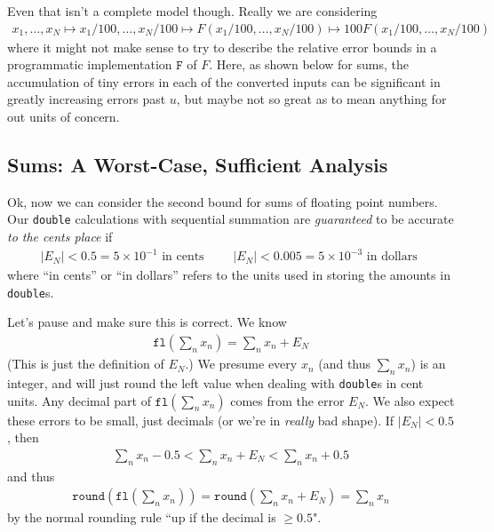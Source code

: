 \documentclass[11pt, oneside]{amsart}   	%
\begin{document}
Even that isn't a complete model though. Really we are considering 
\begin{align*}
    x_1,\dotsc,x_N \mapsto x_1/100,\dotsc,x_N/100 
        \mapsto F(x_1/100,\dotsc,x_N/100) \mapsto 100 F(x_1/100,\dotsc,x_N/100)
\end{align*}
where it might not make sense to try to describe the relative error bounds in a programmatic implementation $\texttt{F}$ of $F$. Here, as shown below for sums, the accumulation of tiny errors in each of the converted inputs can be significant in greatly increasing errors past $u$, but maybe not so great as to mean anything for out units of concern. 

\subsection{Sums: A Worst-Case, Sufficient Analysis}

Ok, now we can consider the second bound for sums of floating point numbers. Our \texttt{double} calculations with sequential summation are {\em guaranteed} to be accurate {\em to the cents place} if
\begin{align*}
    | E_N | < 0.5 = 5\times 10^{-1} \text{ in cents }
    \quad\quad
    | E_N | < 0.005 = 5\times 10^{-3} \text{ in dollars }
\end{align*}
where ``in cents'' or ``in dollars'' refers to the units used in storing the amounts in \texttt{double}s. 

Let's pause and make sure this is correct. We know 
\begin{align*}
    \texttt{fl}\left(\sum_n x_n\right)
        = \sum_n x_n + E_N
\end{align*}
(This is just the definition of $E_N$.) We presume every $x_n$ (and thus $\sum_n x_n$) is an integer, and will just round the left value when dealing with \texttt{double}s in cent units. Any decimal part of $\texttt{fl}\left(\sum_n x_n\right)$ comes from the error $E_N$. We also expect these errors to be small, just decimals (or we're in {\em really} bad shape). If $|E_N| < 0.5$, then 
\begin{align*}
    \sum_n x_n - 0.5 < \sum_n x_n + E_N < \sum_n x_n + 0.5
\end{align*}
and thus
\begin{align*}
    \texttt{round}\left( \texttt{fl}\left(\sum_n x_n\right) \right)
        = \texttt{round}\left( \sum_n x_n + E_N \right)
        = \sum_n x_n
\end{align*}
by the normal rounding rule ``up if the decimal is $\geq 0.5$". 
\end{document}

